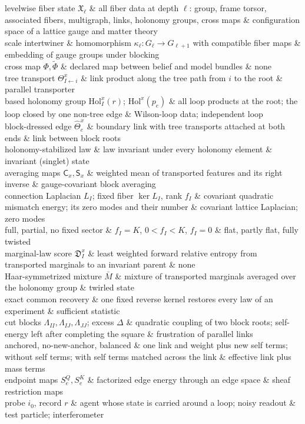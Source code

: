 \begin{decoder}
levelwise fiber state $\mathfrak X_\ell$ & all fiber data at depth $\ell$: group, frame torsor, associated fibers, multigraph, links, holonomy groups, cross maps & configuration space of a lattice gauge and matter theory\\
scale intertwiner & homomorphism $\kappa_\ell:G_\ell\to G_{\ell+1}$ with compatible fiber maps & embedding of gauge groups under blocking\\
cross map $\Phi,\widetilde\Phi$ & declared map between belief and model bundles & none\\
tree transport $\Theta^x_{I\leftarrow i}$ & link product along the tree path from $i$ to the root & parallel transporter\\
based holonomy group $\mathrm{Hol}^x_I(r)$; $\mathrm{Hol}^x(p_e)$ & all loop products at the root; the loop closed by one non-tree edge & Wilson-loop data; independent loop\\
block-dressed edge $\widehat\Theta^x_e$ & boundary link with tree transports attached at both ends & link between block roots\\
holonomy-stabilized law & law invariant under every holonomy element & invariant (singlet) state\\
averaging maps $\mathsf C_x,\mathsf S_x$ & weighted mean of transported features and its right inverse & gauge-covariant block averaging\\
connection Laplacian $L_I$; fixed fiber $\ker L_I$, rank $f_I$ & covariant quadratic mismatch energy; its zero modes and their number & covariant lattice Laplacian; zero modes\\
full, partial, no fixed sector & $f_I=K$, $0<f_I<K$, $f_I=0$ & flat, partly flat, fully twisted\\
marginal-law score $\mathfrak D^x_I$ & least weighted forward relative entropy from transported marginals to an invariant parent & none\\
Haar-symmetrized mixture $\bar M$ & mixture of transported marginals averaged over the holonomy group & twirled state\\
exact common recovery & one fixed reverse kernel restores every law of an experiment & sufficient statistic\\
cut blocks $\Lambda_{II},\Lambda_{IJ},\Lambda_{JJ}$; excess $\Delta$ & quadratic coupling of two block roots; self-energy left after completing the square & frustration of parallel links\\
anchored, no-new-anchor, balanced & one link and weight plus new self terms; without self terms; with self terms matched across the link & effective link plus mass terms\\
endpoint maps $S^Q_e,S^K_e$ & factorized edge energy through an edge space & sheaf restriction maps\\
probe $i_0$, record $r$ & agent whose state is carried around a loop; noisy readout & test particle; interferometer\\
\end{decoder}

